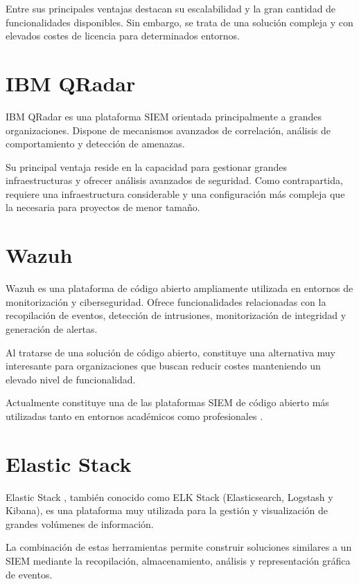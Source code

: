 Entre sus principales ventajas destacan su escalabilidad y la gran cantidad de funcionalidades disponibles. Sin embargo, se trata de una solución compleja y con elevados costes de licencia para determinados entornos.

\section{IBM QRadar}

IBM QRadar \cite{qradar} es una plataforma SIEM orientada principalmente a grandes organizaciones. Dispone de mecanismos avanzados de correlación, análisis de comportamiento y detección de amenazas.

Su principal ventaja reside en la capacidad para gestionar grandes infraestructuras y ofrecer análisis avanzados de seguridad. Como contrapartida, requiere una infraestructura considerable y una configuración más compleja que la necesaria para proyectos de menor tamaño.

\section{Wazuh}

Wazuh \cite{wazuh} es una plataforma de código abierto ampliamente utilizada en entornos de monitorización y ciberseguridad. Ofrece funcionalidades relacionadas con la recopilación de eventos, detección de intrusiones, monitorización de integridad y generación de alertas.

Al tratarse de una solución de código abierto, constituye una alternativa muy interesante para organizaciones que buscan reducir costes manteniendo un elevado nivel de funcionalidad.

Actualmente constituye una de las plataformas SIEM de código abierto más utilizadas tanto en entornos académicos como profesionales \cite{wazuh}.

\section{Elastic Stack}

Elastic Stack \cite{elastic}, también conocido como ELK Stack (Elasticsearch, Logstash y Kibana), es una plataforma muy utilizada para la gestión y visualización de grandes volúmenes de información.

La combinación de estas herramientas permite construir soluciones similares a un SIEM mediante la recopilación, almacenamiento, análisis y representación gráfica de eventos.

